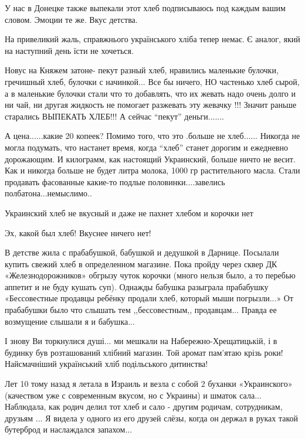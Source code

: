 \begin{itemize}

У нас в Донецке также выпекали этот хлеб подписываюсь под каждым вашим словом.
Эмоции те же. Вкус детства.



На привеликий жаль, справжнього українського хліба тепер немає. Є аналог, який
на наступний день їсти не хочеться.


Новус на Княжем затоне- пекут разный хлеб, нравились маленькие булочки,
гречишный хлеб, булочки с начинкой... Все бы ничего, НО частенько хлеб сырой, а
в маленькие булочки стали что то добавлять, что их жевать надо очень долго и ни
чай, ни другая жидкость не помогает разжевать эту жевачку !!! Значит раньше
старались ВЫПЕКАТЬ ХЛЕБ!!! А сейчас \enquote{пекут} деньги.......

А цена......какие 20 копеек? Помимо того, что это .больше не хлеб......
Никогда не могла подумать, что настанет время, когда \enquote{хлеб} станет дорогим и ежедневно дорожающим.
И килограмм, как настоящий Украинский, больше ничто не весит.
Как и никогда больше не будет литра молока, 1000 гр растительного масла.
Стали продавать фасованные какие-то подлые половинки....завелись полбатона...немыслимо..

Украинский хлеб не вкусный и даже не пахнет хлебом и корочки нет

Эх, какой был хлеб! Вкуснее ничего нет!


В детстве жила с прабабушкой, бабушкой и дедушкой в Дарнице. Посылали купить
свежий хлеб в определенном магазине. Пока пройду через сквер ДК
«Железнодорожников» обгрызу чуток корочки (много нельзя было, а то перебью
аппетит и не буду кушать суп). Однажды бабушка разыграла прабабушку
«Бессовестные продавцы ребёнку продали хлеб, который мыши погрызли...» От
прабабушки было что слышать тем ,,бессовестным,, продавцам... Правда ее
возмущение слышали я и бабушка...



І знову Ви торкнулися душі... ми мешкали на Набережно-Хрещатицькій, і в будинку
був розташований хлібний магазин. Той аромат пам’ятаю крізь роки! Найсмачніший
український хліб подільського дитинства!


Лет 10 тому назад я летала в Израиль и везла с собой 2 буханки «Украинского»
(качеством уже с современным вкусом, но с Украины) и шматок сала... Наблюдала,
как родич делил тот хлеб и сало - другим родичам, сотрудникам, друзьям ... Я
видела у одного из его друзей слёзы, когда он держал в руках такой бутерброд и
наслаждался запахом...



\end{itemize}
